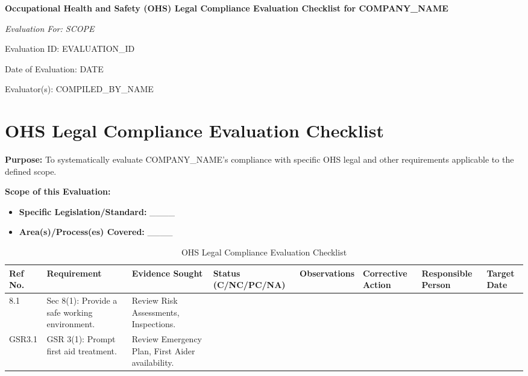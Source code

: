 \documentclass[12pt]{article}
\begin{document}
\begin{titlepage}
    \centering
    \vspace*{2cm}
    {\LARGE\bfseries Occupational Health and Safety (OHS) Legal Compliance Evaluation Checklist for {{COMPANY_NAME}}\par}
    \vspace{1cm}
    {\large\itshape Evaluation For: {{SCOPE}}\par}
    \vspace{0.5cm}
    {\normalsize Evaluation ID: {{EVALUATION_ID}}\par}
    \vspace{0.5cm}
    {\normalsize Date of Evaluation: {{DATE}}\par}
    \vspace{0.5cm}
    {\normalsize Evaluator(s): {{COMPILED_BY_NAME}}\par}
\end{titlepage}

\section{OHS Legal Compliance Evaluation Checklist}

\textbf{Purpose:} To systematically evaluate {{COMPANY_NAME}}'s compliance with specific OHS legal and other requirements applicable to the defined scope.

\textbf{Scope of this Evaluation:}
\begin{itemize}
    \item \textbf{Specific Legislation/Standard:} \_\_\_\_
    \item \textbf{Area(s)/Process(es) Covered:} \_\_\_\_
\end{itemize}

\begin{table}[h]
    \centering
    \begin{tabular}{p{1cm}p{3cm}p{3cm}p{2cm}p{3cm}p{2cm}p{2cm}p{2cm}}
        \toprule
        \textbf{Ref No.} & \textbf{Requirement} & \textbf{Evidence Sought} & \textbf{Status (C/NC/PC/NA)} & \textbf{Observations} & \textbf{Corrective Action} & \textbf{Responsible Person} & \textbf{Target Date} \\
        \midrule
        8.1 & Sec 8(1): Provide a safe working environment. & Review Risk Assessments, Inspections. & & & & & \\
        GSR3.1 & GSR 3(1): Prompt first aid treatment. & Review Emergency Plan, First Aider availability. & & & & & \\
        \bottomrule
    \end{tabular}
    \caption{OHS Legal Compliance Evaluation Checklist}
\end{table}
\end{document}

